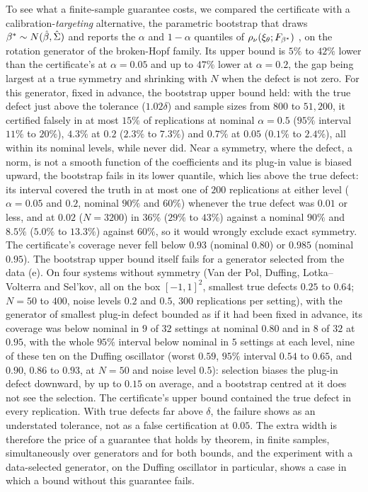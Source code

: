 To see what a finite-sample guarantee costs, we compared the certificate with a
calibration-\emph{targeting} alternative, the parametric bootstrap that draws
$\beta^* \sim N(\hat{\beta},\hat\Sigma)$ and reports the $\alpha$ and $1-\alpha$
quantiles of $\rho_\nu(\xi_\theta;F_{\beta^*})$ \citep{efron1979bootstrap},
on the rotation generator of the broken-Hopf family. Its upper bound is $5\%$
to $42\%$ lower than the certificate's at $\alpha = 0.05$ and up to $47\%$
lower at $\alpha = 0.2$, the gap being largest at a true symmetry and shrinking
with $N$ when the defect is not zero. For this generator, fixed in advance, the
bootstrap upper bound held: with the true defect just above the tolerance
($1.02\delta$) and sample sizes from $800$ to $51{,}200$, it certified falsely
in at most $15\%$ of replications at nominal $\alpha = 0.5$ ($95\%$ interval
$11\%$ to $20\%$), $4.3\%$ at $0.2$ ($2.3\%$ to $7.3\%$) and $0.7\%$ at $0.05$
($0.1\%$ to $2.4\%$), all within its nominal levels, while \symcert{} never
did. Near a symmetry, where the defect, a norm, is not a smooth function of the
coefficients and its plug-in value is biased upward, the bootstrap fails in its
lower quantile, which lies above the true defect: its interval covered the
truth in at most one of $200$ replications at either level ($\alpha = 0.05$ and
$0.2$, nominal $90\%$ and $60\%$) whenever the true defect was $0.01$ or less,
and at $0.02$ ($N = 3200$) in $36\%$ ($29\%$ to $43\%$) against a nominal
$90\%$ and $8.5\%$ ($5.0\%$ to $13.3\%$) against $60\%$, so it would wrongly
exclude exact symmetry.
The certificate's coverage never fell below $0.93$ (nominal $0.80$) or $0.985$
(nominal $0.95$). The bootstrap upper bound itself fails for a generator
selected from the data (\SFtightness e). On four systems without symmetry (Van
der Pol, Duffing, Lotka--Volterra and Sel'kov, all on the box $[-1,1]^2$,
smallest true defects $0.25$ to $0.64$; $N = 50$ to $400$, noise levels $0.2$
and $0.5$, $300$ replications per setting), with the generator of smallest
plug-in defect bounded as if it had been fixed in advance, its coverage was
below nominal in $9$ of $32$ settings at nominal $0.80$ and in $8$ of $32$ at
$0.95$, with the whole $95\%$ interval below nominal in $5$ settings at each
level, nine of these ten on the Duffing oscillator (worst $0.59$, $95\%$
interval $0.54$ to $0.65$, and $0.90$, $0.86$ to $0.93$, at $N = 50$ and noise
level $0.5$): selection biases the plug-in defect downward, by up to $0.15$ on
average, and a bootstrap centred at it does not see the selection. The
certificate's upper bound contained the true defect in every replication. With
true defects far above $\delta$, the failure shows as an understated tolerance,
not as a false certification at $0.05$. The extra width is therefore the price
of a guarantee that holds by theorem, in finite samples, simultaneously over
generators and for both bounds, and the experiment with a data-selected
generator, on the Duffing oscillator in particular, shows a case in which a
bound without this guarantee fails.


